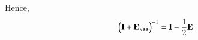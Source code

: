 \documentclass[journal,12pt,twocolumn]{IEEEtran}
\begin{document}
	Hence,
	\begin{align}
	\myvec{\vec{I} + \vec{E}_{\ss}}^{-1} =\vec{I} - \frac{1}{2}\vec{E} \label{2.27}
	\end{align}
	
\end{document}
